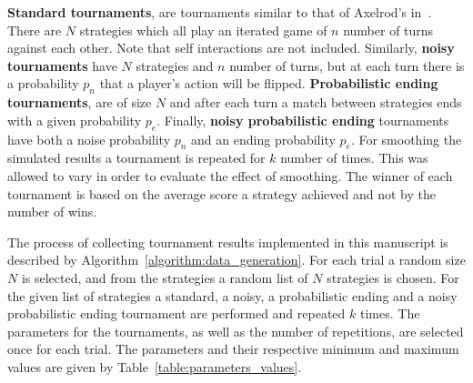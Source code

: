 \documentclass{article}
\newcommand{\numberofstrategies}{}
\begin{document}
\textbf{Standard tournaments}, are tournaments similar to that of Axelrod's
in~\cite{Axelrod1980a}. There are \(N\) strategies which all play an iterated
game of \(n\) number of turns against each other. Note that self interactions
are not included. Similarly, \textbf{noisy
tournaments} have \(N\) strategies and \(n\) number of turns, but at each turn
there is a probability \(p_n\) that a player's action will be flipped.
\textbf{Probabilistic ending tournaments}, are of size \(N\) and after each turn
a match between strategies ends with a given probability \(p_e\). Finally,
\textbf{noisy probabilistic ending} tournaments have both a noise probability
\(p_n\) and an ending probability \(p_e\). For smoothing the simulated results a
tournament is repeated for \(k\) number of times. This was allowed to vary 
in order to evaluate the effect of smoothing. The winner of each tournament
is based on the average score a strategy achieved and not by the number of wins.

The process of collecting tournament results implemented in this manuscript is described by
Algorithm~\ref{algorithm:data_generation}. For each trial a random size \(N\) is
selected, and from the \numberofstrategies strategies a random list of \(N\) strategies is
chosen. For the given list of strategies a standard, a noisy, a probabilistic
ending and a noisy probabilistic ending tournament are performed and repeated
\(k\) times. The parameters for the tournaments, as well as the number of
repetitions, are selected once for each trial. The parameters and their
respective minimum and maximum values are given by
Table~\ref{table:parameters_values}.

\begin{table}[!htbp]
    \begin{center}
    \end{center}
    \caption{Data collection; parameters' values}
    \label{table:parameters_values}
\end{table}
\end{document}
